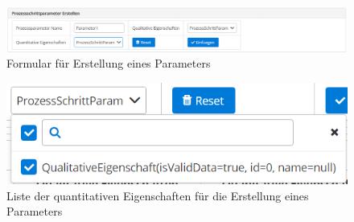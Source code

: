 \documentclass[enabledeprecatedfontcommands,fontsize=12pt,paper=a4,twoside]{scrartcl}
\begin{document}
\begin{figure}[h!]
\begin{center}
 \includegraphics[width=\textwidth]{screenshots/pk/parameterformular.png}
  \caption{Formular für Erstellung eines Parameters}
  \label{fig:boat2}
\end{center}
\end{figure}


\begin{figure}[h!]
\begin{center}
 \includegraphics[width=\textwidth]{screenshots/pk/parameterquanti.png}
  \caption{Liste der quantitativen Eigenschaften für die Erstellung eines Parameters}
  \label{fig:boat2}
\end{center}
\end{figure}
\end{document}
